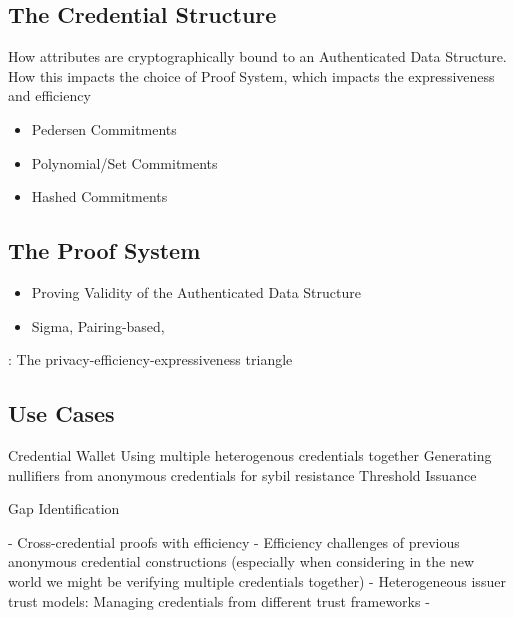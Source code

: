 \subsection{The Credential Structure}
How attributes are cryptographically bound to an Authenticated Data Structure.
How this impacts the choice of Proof System, which impacts the expressiveness and efficiency
\begin{itemize}
    \item Pedersen Commitments
    \item Polynomial/Set Commitments
    \item Hashed Commitments 
\end{itemize}


\subsection{The Proof System}
\begin{itemize}
    \item Proving Validity of the Authenticated Data Structure
    \item Sigma, Pairing-based, 
\end{itemize}

: The privacy-efficiency-expressiveness triangle


\subsection{Use Cases}

Credential Wallet
Using multiple heterogenous credentials together
Generating nullifiers from anonymous credentials for sybil resistance
Threshold Issuance

Gap Identification

- Cross-credential proofs with efficiency
- Efficiency challenges of previous anonymous credential constructions (especially when considering in the new world we might be verifying multiple credentials together)
- Heterogeneous issuer trust models: Managing credentials from different trust frameworks
- 



        
